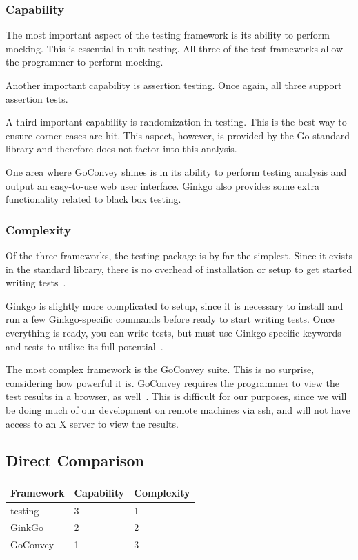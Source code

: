 \documentclass[10pt,letterpaper,onecolumn,journal]{IEEEtran}
\begin{document}
\subsubsection{Capability}

The most important aspect of the testing framework is its ability to perform
mocking. This is essential in unit testing. All three of the test frameworks
allow the programmer to perform mocking.

Another important capability is assertion testing. Once again, all three support
assertion tests.

A third important capability is randomization in testing. This is the best way
to ensure corner cases are hit. This aspect, however, is provided by the Go
standard library and therefore does not factor into this analysis.

One area where GoConvey shines is in its ability to perform testing analysis and
output an easy-to-use web user interface. Ginkgo also provides some extra
functionality related to black box testing.

\subsubsection{Complexity}

Of the three frameworks, the testing package is by far the simplest. Since it
exists in the standard library, there is no overhead of installation or setup to
get started writing tests~\cite{testing}.

Ginkgo is slightly more complicated to setup, since it is necessary to install
and run a few Ginkgo-specific commands before ready to start writing tests. Once
everything is ready, you can write tests, but must use Ginkgo-specific keywords
and tests to utilize its full potential~\cite{ginkgo}.

The most complex framework is the GoConvey suite. This is no surprise,
considering how powerful it is. GoConvey requires the programmer to view the
test results in a browser, as well~\cite{goconvey}. This is difficult for our
purposes, since we will be doing much of our development on remote machines via
ssh, and will not have access to an X server to view the results.

\subsection{Direct Comparison}

\begin{center}
	\begin{tabular}{| l | l | l |}
		\hline
		Framework & Capability & Complexity
		\\ \hline
		testing  & 3 & 1  \\ \hline
		GinkGo   & 2 & 2  \\ \hline
		GoConvey & 1 & 3  \\ \hline
	\end{tabular}
\end{center}
\end{document}
